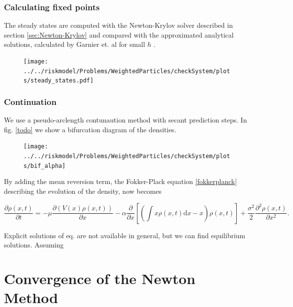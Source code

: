 \documentclass[]{article}
\newcommand{\pa}[2]{\frac{\partial #1}{\partial #2}}
\newcommand{\ppa}[2]{\frac{\partial^2 #1}{\partial #2^2}}
\theoremstyle{definition}
\begin{document}
\subsubsection{Calculating fixed points}
The steady  states are computed with the Newton-Krylov solver described in section \ref{sec:Newton-Krylov} and compared with the approximated analytical solutions, calculated by Garnier et. al for small $h$ \cite{Garnier}.



\begin{center}
\begin{figure}
\texttt{[image: ../../riskmodel/Problems/WeightedParticles/checkSystem/plots/steady\_states.pdf]}
\caption{\label{fig:bif_anal}}
\end{figure}
\end{center}



\subsubsection{Continuation}
We use a pseudo-arclength contunaution method with secant prediction steps.
In fig. \ref{todo} we show a bifurcation diagram of the densities. 





\begin{center}
\begin{figure}
\texttt{[image: ../../riskmodel/Problems/WeightedParticles/checkSystem/plots/bif\_alpha]}
\caption{\label{fig:bif_anal}}
\end{figure}
\end{center}




%
%


By adding the mean reversion term, the Fokker-Plack equation \eqref{fokkerplanck}  describing the evolution of the density, now becomes

\begin{equation}
\label{fp_mean_field}
\pa{\rho(x,t)}{t} = - \mu \pa{( V(x) \rho(x,t))}{x} - \alpha \pa{}{x} \left[ \left(\int x \rho(x,t) \mathrm{d}x  -x \right) \rho(x,t) \right] + \frac{\sigma^2}{2}  \ppa{\rho(x,t)}{x} .
\end{equation}

Explicit solutions of eq. \label{fp_mean_field} are not available in general, but we can find equilibrium solutions. Assuming 





\section{Convergence of the Newton Method}





\end{document}
